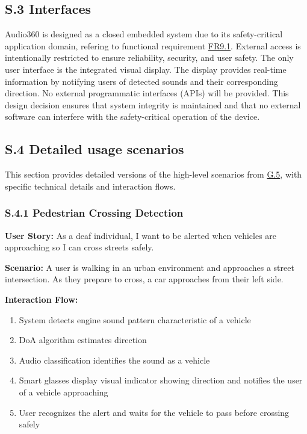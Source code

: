 \documentclass[12pt]{article}
\theoremstyle{definition}
\begin{document}
\subsection{S.3 Interfaces}
Audio360 is designed as a closed embedded system due to its safety-critical
application domain, refering to functional requirement \hyperref[FR9_1]{FR9.1}.
External access is intentionally restricted to ensure reliability, security,
and user safety.
The only user interface is the integrated visual display. The display provides
real-time information by notifying users of detected sounds and their
corresponding direction.
No external programmatic interfaces (APIs) will be provided. This design
decision ensures that system integrity is maintained and that no external
software can interfere with the safety-critical operation of the device.

\subsection{S.4 Detailed usage scenarios}

This section provides detailed versions of the high-level scenarios from
\hyperref[item: G.5]{G.5}, with specific technical details and interaction
flows.

\subsubsection{S.4.1 Pedestrian Crossing Detection}
\textbf{User Story:} As a deaf individual, I want to be alerted when vehicles are approaching so I can cross streets safely.

\textbf{Scenario:} A user is walking in an urban environment and approaches a street intersection. As they prepare to cross, a car approaches from their left side.

\textbf{Interaction Flow:}
\begin{enumerate}
    \item System detects engine sound pattern characteristic of a vehicle
    \item DoA algorithm estimates direction
    \item Audio classification identifies the sound as a vehicle
    \item Smart glasses display visual indicator showing direction and notifies the user of a vehicle approaching
    \item User recognizes the alert and waits for the vehicle to pass before crossing safely
\end{enumerate}
\end{document}
